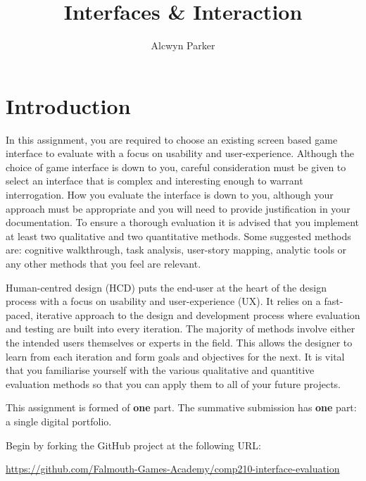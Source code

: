 \documentclass{../fal_assignment}
\title{Interfaces \& Interaction}
\author{Alcwyn Parker}
\begin{document}
\maketitle

\section*{Introduction}

In this assignment, you are required to choose an existing screen based game interface to evaluate with a focus on usability and user-experience. Although the choice of game interface is down to you, careful consideration must be given to select an interface that is complex and interesting enough to warrant interrogation. How you evaluate the interface is down to you, although your approach must be appropriate and you will need to provide justification in your documentation. To ensure a thorough evaluation it is advised that you implement at least two qualitative and two quantitative methods. Some suggested methods are: cognitive walkthrough, task analysis, user-story mapping, analytic tools or any other methods that you feel are relevant. 

Human-centred design (HCD) puts the end-user at the heart of the design process with a focus on usability and user-experience (UX). It relies on a fast-paced, iterative approach to the design and development process where evaluation and testing are built into every iteration. The majority of methods involve either the intended users themselves or experts in the field. This allows the designer to learn from each iteration and form goals and objectives for the next. It is vital that you familiarise yourself with the various qualitative and quantitive evaluation methods so that you can apply them to all of your future projects.  

This assignment is formed of \textbf{one} part.
The summative submission has \textbf{one} part: a single digital portfolio. 

Begin by forking the GitHub project at the following URL:
\begin{center}
\url{https://github.com/Falmouth-Games-Academy/comp210-interface-evaluation}
\end{center}
\end{document}
